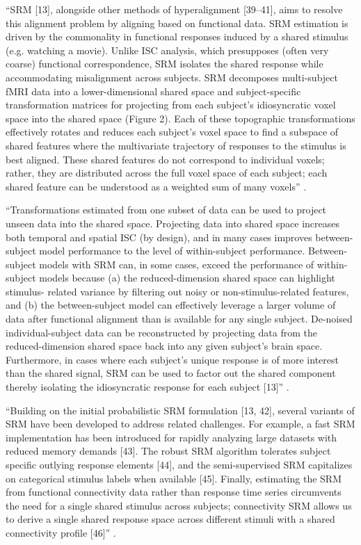 ``SRM [13], alongside other methods of hyperalignment [39–41], aims to resolve
this alignment problem by aligning based on functional data. SRM estimation is
driven by the commonality in functional responses induced by a shared stimulus
(e.g. watching a movie). Unlike ISC analysis, which presupposes (often very
coarse) functional correspondence, SRM isolates the shared response while
accommodating misalignment across subjects. SRM decomposes multi-subject fMRI
data into a lower-dimensional shared space and subject-specific transformation
matrices for projecting from each subject’s idiosyncratic voxel space into the
shared space (Figure 2). Each of these topographic transformations effectively
rotates and reduces each subject’s voxel space to find a subspace of shared
features where the multivariate trajectory of responses to the stimulus is best
aligned. These shared features do not correspond to individual voxels; rather,
they are distributed across the full voxel space of each subject; each shared
feature can be understood as a weighted sum of many voxels''
\citep{kumar2020brainiak}.

``Transformations estimated from one subset of data can be used to project
unseen data into the shared space. Projecting data into shared space increases
both temporal and spatial ISC (by design), and in many cases improves
between-subject model performance to the level of within-subject performance.
Between-subject models with SRM can, in some cases, exceed the performance of
within-subject models because (a) the reduced-dimension shared space can
highlight stimulus- related variance by filtering out noisy or
non-stimulus-related features, and (b) the between-subject model can effectively
leverage a larger volume of data after functional alignment than is available
for any single subject. De-noised individual-subject data can be reconstructed
by projecting data from the reduced-dimension shared space back into any given
subject’s brain space.  Furthermore, in cases where each subject’s unique
response is of more interest than the shared signal, SRM can be used to factor
out the shared component thereby isolating the idiosyncratic response for each
subject [13]'' \citep{kumar2020brainiak}.

``Building on the initial probabilistic SRM formulation [13, 42], several
variants of SRM have been developed to address related challenges. For example,
a fast SRM implementation has been introduced for rapidly analyzing large
datasets with reduced memory demands [43]. The robust SRM algorithm tolerates
subject specific outlying response elements [44], and the semi-supervised SRM
capitalizes on categorical stimulus labels when available [45]. Finally,
estimating the SRM from functional connectivity data rather than response time
series circumvents the need for a single shared stimulus across subjects;
connectivity SRM allows us to derive a single shared response space across
different stimuli with a shared connectivity profile [46]''
\citep{kumar2020brainiak}.

